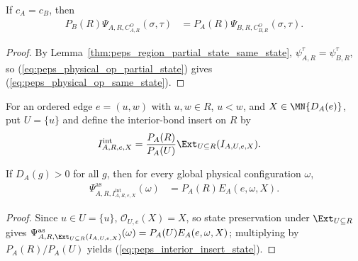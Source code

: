 \begin{lemma}%
    \label{thm:peps_physical_operator_same_state_transfer}
    \leanok
    If $c_A=c_B$, then
    \begin{align}
        P_B(R)\Psi_{A,R,C^O_{A,R}}(\sigma,\tau)
         & =P_A(R)\Psi_{B,R,C^O_{B,R}}(\sigma,\tau).
        \label{eq:peps_physical_op_same_state}
    \end{align}
\end{lemma}
\begin{proof}
    \leanok
    By Lemma~\ref{thm:peps_region_partial_state_same_state},
    $\psi^\tau_{A,R}=\psi^\tau_{B,R}$, so (\ref{eq:peps_physical_op_partial_state})
    gives (\ref{eq:peps_physical_op_same_state}).
\end{proof}

\begin{definition}%
    \label{def:peps_interior_bond_inserted_region_insert}
    \leanok
    For an ordered edge $e=(u,w)$ with $u,w\in R$, $u<w$, and
    $X\in\MN{D_A(e)}$, put $U=\{u\}$ and define the interior-bond insert on $R$ by
    \begin{align}
        I^{\mathrm{int}}_{A,R,e,X}
         & =
        \frac{P_A(R)}{P_A(U)}
        \Ext_{U\subseteq R}(I_{A,U,e,X}).
        \notag
    \end{align}
\end{definition}

\begin{lemma}%
    \label{thm:peps_interior_bond_inserted_state}
    \leanok
    If $D_A(g)>0$ for all $g$, then for every global physical configuration
    $\omega$,
    \begin{align}
        \Psi^{\mathrm{as}}_{A,R,I^{\mathrm{int}}_{A,R,e,X}}(\omega)
         & =P_A(R)E_A(e,\omega,X).
        \label{eq:peps_interior_insert_state}
    \end{align}
\end{lemma}
\begin{proof}
    \leanok
    Since $u\in U=\{u\}$, $\mathcal O_{U,e}(X)=X$, so state preservation under
    $\Ext_{U\subseteq R}$ gives
    $\Psi^{\mathrm{as}}_{A,R,\Ext_{U\subseteq R}(I_{A,U,e,X})}(\omega)=P_A(U)E_A(e,\omega,X)$;
    multiplying by $P_A(R)/P_A(U)$ yields (\ref{eq:peps_interior_insert_state}).
\end{proof}

